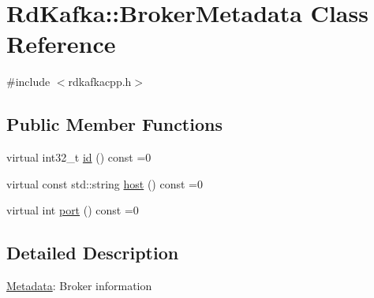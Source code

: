 \hypertarget{classRdKafka_1_1BrokerMetadata}{\section{Rd\-Kafka\-:\-:Broker\-Metadata Class Reference}
\label{classRdKafka_1_1BrokerMetadata}
}


{\ttfamily \#include $<$rdkafkacpp.\-h$>$}

\subsection*{Public Member Functions}
\begin{DoxyCompactItemize}
\item 
virtual int32\-\_\-t \hyperlink{classRdKafka_1_1BrokerMetadata_a710a293146153e0432f7424c47b08fe9}{id} () const =0
\item 
virtual const std\-::string \hyperlink{classRdKafka_1_1BrokerMetadata_a3aaa8091dc05b48eced63224ceb401fc}{host} () const =0
\item 
virtual int \hyperlink{classRdKafka_1_1BrokerMetadata_a449571140017db5fe1b71512cc645429}{port} () const =0
\end{DoxyCompactItemize}


\subsection{Detailed Description}
\hyperlink{classRdKafka_1_1Metadata}{Metadata}\-: Broker information 

